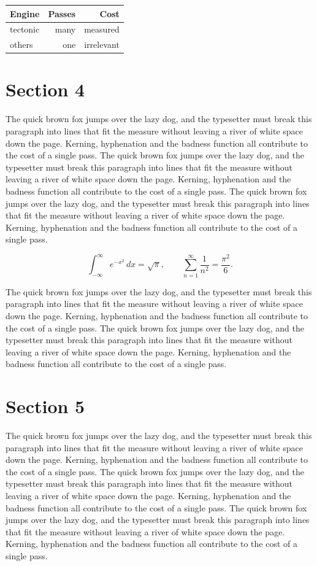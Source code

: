 \documentclass{article}
\begin{document}
\begin{center}
\begin{tabular}{lrr}
\toprule
Engine & Passes & Cost \\
\midrule
tectonic & many & measured \\
others & one & irrelevant \\
\bottomrule
\end{tabular}
\end{center}

\section{Section 4}
The quick brown fox jumps over the lazy dog, and the typesetter must break this paragraph into lines that fit the measure without leaving a river of white space down the page. Kerning, hyphenation and the badness function all contribute to the cost of a single pass. The quick brown fox jumps over the lazy dog, and the typesetter must break this paragraph into lines that fit the measure without leaving a river of white space down the page. Kerning, hyphenation and the badness function all contribute to the cost of a single pass. The quick brown fox jumps over the lazy dog, and the typesetter must break this paragraph into lines that fit the measure without leaving a river of white space down the page. Kerning, hyphenation and the badness function all contribute to the cost of a single pass. 

\begin{equation}
\int_{-\infty}^{\infty} e^{-x^{2}}\,dx = \sqrt{\pi}, \qquad
\sum_{n=1}^{\infty} \frac{1}{n^{2}} = \frac{\pi^{2}}{6}.
\end{equation}

The quick brown fox jumps over the lazy dog, and the typesetter must break this paragraph into lines that fit the measure without leaving a river of white space down the page. Kerning, hyphenation and the badness function all contribute to the cost of a single pass. The quick brown fox jumps over the lazy dog, and the typesetter must break this paragraph into lines that fit the measure without leaving a river of white space down the page. Kerning, hyphenation and the badness function all contribute to the cost of a single pass. 
\section{Section 5}
The quick brown fox jumps over the lazy dog, and the typesetter must break this paragraph into lines that fit the measure without leaving a river of white space down the page. Kerning, hyphenation and the badness function all contribute to the cost of a single pass. The quick brown fox jumps over the lazy dog, and the typesetter must break this paragraph into lines that fit the measure without leaving a river of white space down the page. Kerning, hyphenation and the badness function all contribute to the cost of a single pass. The quick brown fox jumps over the lazy dog, and the typesetter must break this paragraph into lines that fit the measure without leaving a river of white space down the page. Kerning, hyphenation and the badness function all contribute to the cost of a single pass. 
\end{document}
